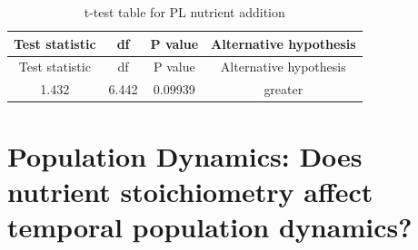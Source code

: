\documentclass[]{article}
\begin{document}
\begin{longtable}[]{@{}cccc@{}}
\caption{t-test table for PL nutrient addition}\tabularnewline
\toprule
\begin{minipage}[b]{0.21\columnwidth}\centering\strut
Test statistic\strut
\end{minipage} & \begin{minipage}[b]{0.07\columnwidth}\centering\strut
df\strut
\end{minipage} & \begin{minipage}[b]{0.12\columnwidth}\centering\strut
P value\strut
\end{minipage} & \begin{minipage}[b]{0.30\columnwidth}\centering\strut
Alternative hypothesis\strut
\end{minipage}\tabularnewline
\midrule
\endfirsthead
\toprule
\begin{minipage}[b]{0.21\columnwidth}\centering\strut
Test statistic\strut
\end{minipage} & \begin{minipage}[b]{0.07\columnwidth}\centering\strut
df\strut
\end{minipage} & \begin{minipage}[b]{0.12\columnwidth}\centering\strut
P value\strut
\end{minipage} & \begin{minipage}[b]{0.30\columnwidth}\centering\strut
Alternative hypothesis\strut
\end{minipage}\tabularnewline
\midrule
\endhead
\begin{minipage}[t]{0.21\columnwidth}\centering\strut
1.432\strut
\end{minipage} & \begin{minipage}[t]{0.07\columnwidth}\centering\strut
6.442\strut
\end{minipage} & \begin{minipage}[t]{0.12\columnwidth}\centering\strut
0.09939\strut
\end{minipage} & \begin{minipage}[t]{0.30\columnwidth}\centering\strut
greater\strut
\end{minipage}\tabularnewline
\bottomrule
\end{longtable}

\newpage

\section{Population Dynamics: Does nutrient stoichiometry affect
temporal population
dynamics?}\label{population-dynamics-does-nutrient-stoichiometry-affect-temporal-population-dynamics}
\end{document}
